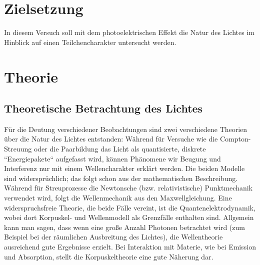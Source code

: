 \section*{Zielsetzung}
\label{sec:Zielsetzung}
In diesem Versuch soll mit dem photoelektrischen Effekt die Natur des Lichtes im Hinblick
auf einen Teilchencharakter untersucht werden.

\section{Theorie}
\label{sec:Theorie}

\subsection{Theoretische Betrachtung des Lichtes}
\label{sec:Theoretische Betrachtung des Lichtes}

Für die Deutung verschiedener Beobachtungen sind zwei verschiedene Theorien über die Natur
des Lichtes entstanden: Während für Versuche wie die Compton-Streuung oder die Paarbildung
das Licht als quantisierte, diskrete ``Energiepakete`` aufgefasst wird, können Phänomene
wir Beugung und Interferenz nur mit einem Wellencharakter erklärt werden.
Die beiden Modelle sind widersprüchlich; das folgt schon aus der mathematischen
Beschreibung. Während für Streuprozesse die Newtonsche (bzw. relativistische) Punktmechanik
verwendet wird, folgt die Wellenmechanik aus den Maxwellgleichung.
Eine widerspruchsfreie Theorie, die beide Fälle vereint, ist die Quantenelektrodynamik,
wobei dort Korpuskel- und Wellenmodell als Grenzfälle enthalten sind. Allgemein kann man
sagen, dass wenn eine große Anzahl Photonen betrachtet wird (zum Beispiel bei der
räumlichen Ausbreitung des Lichtes), die Wellentheorie ausreichend gute Ergebnisse
erzielt. Bei Interaktion mit Materie, wie bei Emission und Absorption, stellt die
Korpuskeltheorie eine gute Näherung dar.

